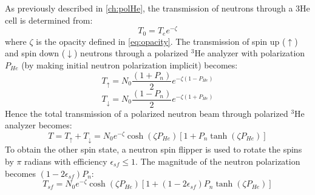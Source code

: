 As previously described in \cref{ch:polHe}, the transmission of neutrons through a 3He cell is determined from:
\begin{equation}\label{eq:tzero}
    T_0=T_e e^{-\zeta}
\end{equation} 
where $\zeta$ is the opacity defined in \cref{eq:opacity}. The transmission of spin up ($\uparrow$) and spin down ($\downarrow$) neutrons through a polarized $^3$He analyzer with polarization $P_{He}$ (by making initial neutron polarization implicit) becomes:
\begin{equation}
    T_\uparrow = N_0\frac{\left(1+P_n\right)}{2}e^{-\zeta (1-P_{He})}
\end{equation}
\begin{equation}
    T_\downarrow = N_0\frac{\left(1-P_n\right)}{2}e^{-\zeta (1+P_{He})}
\end{equation}
Hence the total transmission of a polarized neutron beam through polarized $^3$He analyzer becomes:
\begin{equation}\label{eq:t}
    T = T_\uparrow + T_\downarrow = N_0e^{-\zeta}\cosh{\left(\zeta P_{He}\right)}\left[1+P_n\tanh{\left(\zeta P_{He}\right)}\right]
\end{equation}
To obtain the other spin state, a neutron spin flipper is used to rotate the spins by $\pi$ radians with efficiency $\epsilon_{sf}\leq1$. The magnitude of the neutron polarization becomes $(1-2\epsilon_{sf})P_n$: 
\begin{equation}\label{eq:tsf}
    T_{sf} = N_0e^{-\zeta}\cosh{\left(\zeta P_{He}\right)}\left[1+\left(1-2\epsilon_{sf}\right)P_n\tanh{\left(\zeta P_{He}\right)}\right]
\end{equation}

